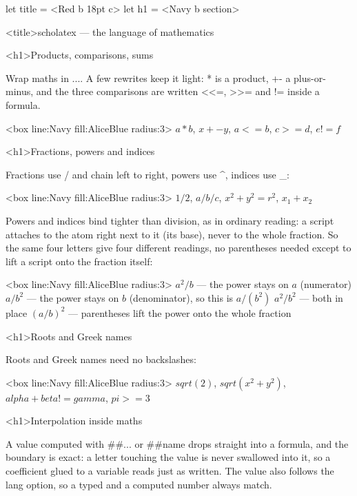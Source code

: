 \documentclass[
  margins=18,
  font=Latin Modern Roman,
  size=12,
  linespread=1.4,
  lang=en
]{scholatex}
\begin{document}
let title = <Red b 18pt c>
let h1    = <Navy b section>

<title>scholatex — the language of mathematics

<h1>Products, comparisons, sums

Wrap maths in $...$. A few rewrites keep it light: * is a
product, +- a plus-or-minus, and the three comparisons are written
<<=, >>= and != inside a formula.

<box line:Navy fill:AliceBlue radius:3>{
	$a * b$, $x +- y$, $a <= b$, $c >= d$, $e != f$
}

<h1>Fractions, powers and indices

Fractions use / and chain left to right, powers use ^,
indices use _:

<box line:Navy fill:AliceBlue radius:3>{
	$1/2$, $a/b/c$, $x^2 + y^2 = r^2$, $x_1 + x_2$
}

Powers and indices bind tighter than division, as in ordinary reading: a
script attaches to the atom right next to it (its base), never to the whole
fraction. So the same four letters give four different readings, no
parentheses needed except to lift a script onto the fraction itself:

<box line:Navy fill:AliceBlue radius:3>{
	$a^2/b$ — the power stays on $a$ (numerator)
	$a/b^2$ — the power stays on $b$ (denominator), so this is $a/(b^2)$
	$a^2/b^2$ — both in place
	$(a/b)^2$ — parentheses lift the power onto the whole fraction
}

<h1>Roots and Greek names

Roots and Greek names need no backslashes:

<box line:Navy fill:AliceBlue radius:3>{
	$sqrt(2)$, $sqrt(x^2 + y^2)$, $alpha + beta != gamma$, $pi >= 3$
}

<h1>Interpolation inside maths

A value computed with ##{{...}} or ##name drops straight into
a formula, and the boundary is exact: a letter touching the value is never
swallowed into it, so a coefficient glued to a variable reads just as written.
The value also follows the lang option, so a typed and a computed
number always match.
\end{document}
